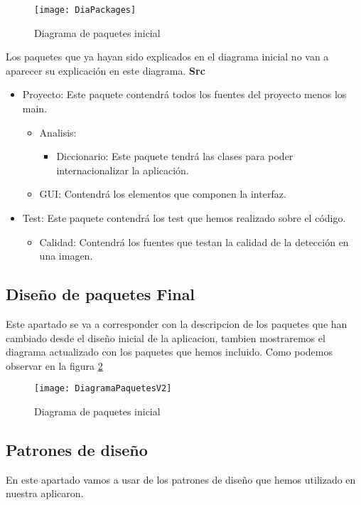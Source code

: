 \begin{figure}[h]
	\centering
	\texttt{[image: DiaPackages]}
	\caption{Diagrama de paquetes inicial}
	\label{fig:C.1.2}
\end{figure}
Los paquetes que ya hayan sido explicados en el diagrama inicial no van a aparecer su explicación en este diagrama.
\textbf{Src}
\begin{itemize}
		\item Proyecto: Este paquete contendrá todos los fuentes del proyecto menos los main.
	\begin{itemize}
			\item Analisis:
			\begin{itemize}
				\item Diccionario: Este paquete tendrá las clases para poder internacionalizar la aplicación.
			\end{itemize}
			\item GUI: Contendrá los elementos que componen la interfaz.
	\end{itemize}
		\item Test: Este paquete contendrá los test que hemos realizado sobre el código.
		\begin{itemize}
			\item Calidad: Contendrá los fuentes que testan la calidad de la detección en una imagen.
		\end{itemize}
\end{itemize}

\subsection{Diseño de paquetes Final}
Este apartado se va a corresponder con la descripcion de los paquetes que han cambiado desde el diseño inicial de la aplicacion, tambien mostraremos el diagrama actualizado con los paquetes que hemos incluido. Como podemos observar en la figura \ref{fig:PaquetesFinal}

\begin{figure}[h]
	\centering
	\texttt{[image: DiagramaPaquetesV2]}
	\caption{Diagrama de paquetes inicial}
	\label{fig:PaquetesFinal}
\end{figure}

\subsection{Patrones de diseño}
En este apartado vamos a usar de los patrones de diseño que hemos utilizado en nuestra aplicaron.

